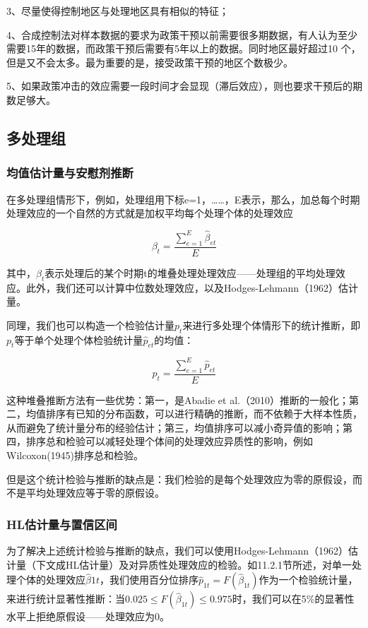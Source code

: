 \documentclass[cn,12pt,math=newtx,citestyle=gb7714-2015,bibstyle=gb7714-2015]{elegantbook}
\begin{document}
	3、尽量使得控制地区与处理地区具有相似的特征；
	
	4、合成控制法对样本数据的要求为政策干预以前需要很多期数据，有人认为至少需要15年的数据，而政策干预后需要有5年以上的数据。同时地区最好超过10 个，但是又不会太多。最为重要的是，接受政策干预的地区个数极少。
	
	5、如果政策冲击的效应需要一段时间才会显现（滞后效应），则也要求干预后的期数足够大。
	
	  \subsection{多处理组}
	  \subsubsection{均值估计量与安慰剂推断}
	   
     在多处理组情形下，例如，处理组用下标e=1，……，E表示，那么，加总每个时期处理效应的一个自然的方式就是加权平均每个处理个体的处理效应
     
     $$\beta_{t}=\frac{\sum_{e=1}^E \hat{\beta}_{et}}{E}$$
     
     其中，$\beta_{t}$表示处理后的某个时期t的堆叠处理处理效应——处理组的平均处理效应。此外，我们还可以计算中位数处理效应，以及Hodges-Lehmann（1962）估计量。
     
     同理，我们也可以构造一个检验估计量$p_t$来进行多处理个体情形下的统计推断，即$p_t$等于单个处理个体检验统计量$\hat{p}_{et}$的均值：
     
     $$p_{t}=\frac{\sum_{e=1}^E \hat{p}_{et}}{E}$$
     
     这种堆叠推断方法有一些优势：第一，是Abadie et al.（2010）推断的一般化；第二，均值排序有已知的分布函数，可以进行精确的推断，而不依赖于大样本性质，从而避免了统计量分布的经验估计；第三，均值排序可以减小奇异值的影响；第四，排序总和检验可以减轻处理个体间的处理效应异质性的影响，例如Wilcoxon(1945)排序总和检验。
     
     但是这个统计检验与推断的缺点是：我们检验的是每个处理效应为零的原假设，而不是平均处理效应等于零的原假设。
     
     \subsubsection{HL估计量与置信区间}
     
     为了解决上述统计检验与推断的缺点，我们可以使用Hodges-Lehmann（1962）估计量（下文成HL估计量）及对异质性处理效应的检验。如11.2.1节所述，对单一处理个体的处理效应$\hat{\beta}{1t}$，我们使用百分位排序$\hat{p}_{1t}=F(\hat{\beta}_{1t})$作为一个检验统计量，来进行统计显著性推断：当$0.025 \leq F(\hat{\beta}_{1t}) \leq 0.975$时，我们可以在5\%的显著性水平上拒绝原假设——处理效应为0。
     
\end{document}
